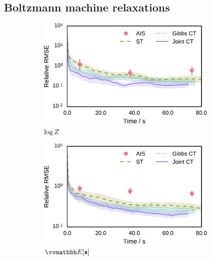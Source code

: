 \subsection{Boltzmann machine relaxations}\label{subsec:exp-bm-relaxations}

\begin{figure}[t]
\centering
\begin{subfigure}[b]{.33\linewidth}
\vskip 0pt
\centering
\includegraphics[width=0.95\textwidth]{images/continuous-tempering/gaussian-bm-relaxation-30-unit-scale-6-log-norm-rmses-t2} 
\caption{$\log Z$}\label{sfig:bmr-30-unit-scale-6-log-norm}
\end{subfigure}%
\begin{subfigure}[b]{.33\linewidth}
\vskip 0pt
\centering
\includegraphics[width=0.95\textwidth]{images/continuous-tempering/gaussian-bm-relaxation-30-unit-scale-6-mean-rmses-t2}
\caption{$\expc{\rvct{x}}$}\label{sfig:bmr-30-unit-scale-6-mean}
\end{subfigure}
\begin{subfigure}[b]{.33\linewidth}

\end{subfigure}
\end{figure}
